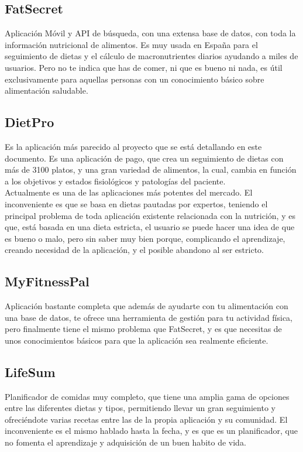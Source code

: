 \subsection{FatSecret}
Aplicación Móvil y API de búsqueda, con una extensa base de datos, con toda la información nutricional de alimentos. Es muy usada en España para el seguimiento de dietas y el cálculo de macronutrientes diarios ayudando a miles de usuarios. Pero no te indica que has de comer, ni que es bueno ni nada, es útil exclusivamente para aquellas personas con un conocimiento básico sobre alimentación saludable. \\
\subsection{DietPro}
Es la aplicación más parecido al proyecto que se está detallando en este documento. Es una aplicación de pago, que crea un seguimiento de dietas con más de 3100 platos, y una gran variedad de alimentos, la cual, cambia en función a los objetivos y estados fisiológicos y patologías del paciente.\\
Actualmente es una de las aplicaciones más potentes del mercado. El inconveniente es que se basa en dietas pautadas por expertos, teniendo el principal problema de toda aplicación existente relacionada con la nutrición, y es que, está basada en una dieta estricta, el usuario se puede hacer una idea de que es bueno o malo, pero sin saber muy bien porque, complicando el aprendizaje, creando necesidad de la aplicación, y el posible abandono al ser estricto.\\
\subsection{MyFitnessPal}
Aplicación bastante completa que además de ayudarte con tu alimentación con una base de datos, te ofrece una herramienta de gestión para tu actividad física, pero finalmente tiene el mismo problema que FatSecret, y es que necesitas de unos conocimientos básicos para que la aplicación sea realmente eficiente.\\
\subsection{LifeSum}
Planificador de comidas muy completo, que tiene una amplia gama de opciones entre las diferentes dietas y tipos, permitiendo llevar un gran seguimiento y ofreciéndote varias recetas entre las de la propia aplicación y su comunidad. El inconveniente es el mismo hablado hasta la fecha, y es que es un planificador, que no fomenta el aprendizaje y adquisición de un buen habito de vida.
	
